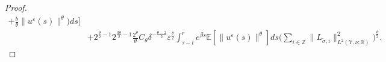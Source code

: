 \documentclass[11pt]{article}
\numberwithin{equation}{section}
\theoremstyle{plain}
\begin{document}
\begin{proof}
\begin{align}
                                                   	      + \frac{b}{\theta} 
                                              	                  \|u^{\varepsilon}(s)\|^{\theta}  
                                                 \Big)
                                            ds
                                \bigg]  \nonumber\\
     & + 2^{\frac{\theta}{2} - 1} 2^{\frac{3\theta}{2} -1} 
                \frac{2^{\theta} }{\theta} C_{\theta} 
                \delta^{-\frac{\theta - 2}{2} } \varepsilon^{\frac{\theta}{2} }
                    \int_{\tau-t}^{r} e^{\beta s}  
                        \mathbb{E} \left[ \| u^{\varepsilon}(s) \|^\theta \right]                                                   
                     ds  
                      \Big( \sum_{i \in \mathbb{Z} } 
                                     \| L_{ \widetilde{\sigma}, i} \|_{L^2(\mathbb{Y}, \nu; \mathbb{R} ) }^2 
                      \Big)^{\frac{\theta}{2} }.                                                                     
\end{align}     


\end{proof}
\end{document}
